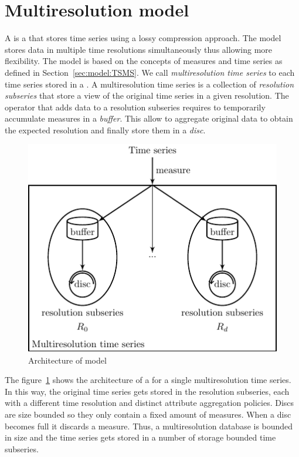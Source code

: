 \section{Multiresolution model}
\label{sec:MTSMS}


A  is a  that stores time series using a lossy
compression approach. The model stores data in multiple time
resolutions simultaneously thus allowing more flexibility.
%
The  model is based on the concepts of measures and time
series as defined in Section~\ref{sec:model:TSMS}. We call
\emph{multiresolution time series} to each time series stored in a
. 
%
A multiresolution time series is a collection of \emph{resolution
  subseries} that store a view of the original time series in a given
resolution.
%
The operator that adds data to a resolution subseries requires to
temporarily accumulate measures in a \emph{buffer}. This allow to
aggregate original data to obtain the expected resolution and finally
store them in a \emph{disc}.


\begin{figure}
  \centering
  \includegraphics{fig_model_mtsdb.pdf}
  \caption{Architecture of  model}
  \label{fig:model:mtsdb}
\end{figure}

The figure~\ref{fig:model:mtsdb} shows the architecture of a
 for a single multiresolution time series.
%
In this way, the original time series gets stored in the resolution
subseries, each with a different time resolution and distinct
attribute aggregation policies. Discs are size bounded so they only
contain a fixed amount of measures. When a disc becomes full it
discards a measure. Thus, a multiresolution database is bounded in
size and the time series gets stored in a number of storage bounded
time subseries.

